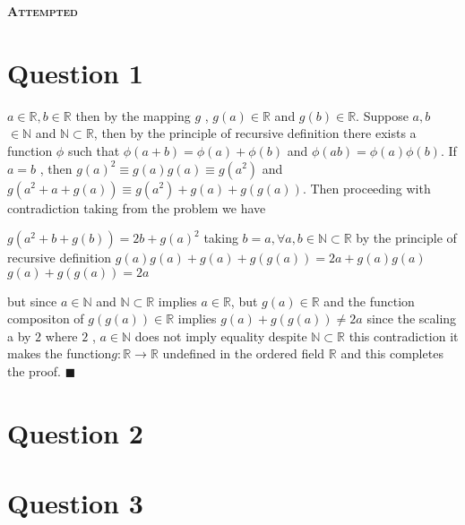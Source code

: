 \documentclass[a4paper, 12pt]{article}
\begin{document}
\begin{center}
    \fontsize{24pt}{10pt}\selectfont
    \textsc{\textbf{Attempted}}
\end{center}

\section{Question 1}

$a  \in  \mathbb{R}, b  \in  \mathbb{R}$ then by  the mapping $g$ , $g(a)  \in \mathbb{R}$ and
$g(b) \in \mathbb{R}$. Suppose $a,b$ $\in \mathbb{N}$  and $\mathbb{N} \subset \mathbb{R}$, 
then by the principle of recursive definition there exists a function $\phi$ such that
$\phi(a + b) = \phi(a) + \phi(b)$ and $\phi(ab) = \phi(a)\phi(b)$.
If $a = b$ , then $g(a)^2 \equiv g(a)g(a) \equiv g(a^2)$  and $g(a^2 + a + g(a)) \equiv g(a^2)  + g(a) + g(g(a))$.
Then proceeding with contradiction taking from the problem we have

   \begin{justify} 
    \begin{center}
    $g(a^2 + b + g(b)) = 2b + g(a)^2$ \newline
    taking $b = a, \forall a,b \in \mathbb{N} \subset\mathbb{R}$ \newline 
    by the principle of recursive definition \newline
    $g(a)g(a) + g(a) + g(g(a)) = 2a + g(a)g(a)$ \newline
    $g(a) + g(g(a)) = 2a$ \newline
    \end{center}
   \end{justify}

but since $a \in \mathbb{N}$ and $\mathbb{N} \subset \mathbb{R}$ implies  $a \in \mathbb{R}$,
but $g(a) \in \mathbb{R}$ and the function compositon of $g(g(a)) \in \mathbb{R}$ implies $g(a) + g(g(a))\neq 2a$ \newline
since the scaling a by $2$ where $2$ , $a \in\mathbb{N}$ does not imply equality despite $\mathbb{N} \subset \mathbb{R}$ \newline
this contradiction it makes the function$ g:\mathbb{R}\longrightarrow \mathbb{R}$ \newline
undefined in the ordered field $\mathbb{R}$ and this 
completes the proof. $\blacksquare$

\newpage

\section{Question 2}



\newpage

\section{Question 3}
\end{document}
